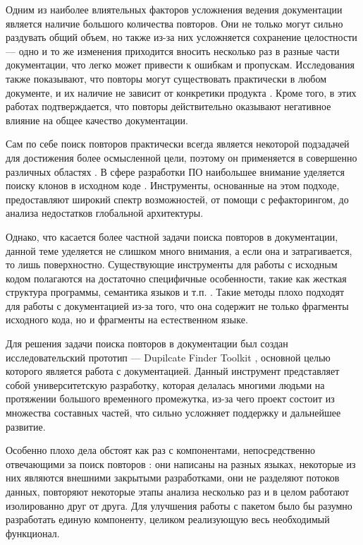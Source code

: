 \documentclass[14pt]{matmex-diploma-custom}
\begin{document}
Одним из наиболее влиятельных факторов усложнения ведения документации является наличие большого количества повторов. Они не только могут сильно раздувать общий объем, но также из-за них усложняется сохранение целостности --- одно и то же изменения приходится вносить несколько раз в разные части документации, что легко может привести к ошибкам и пропускам. Исследования также показывают, что повторы могут существовать практически в любом документе, и их наличие не зависит от конкретики продукта \cite{bib:art:JuergensCloneDetect, bib:art:DuplicatesStudy}. Кроме того, в этих работах подтверждается, что повторы действительно оказывают негативное влияние на общее качество документации.

Сам по себе поиск повторов практически всегда является некоторой подзадачей для достижения более осмысленной цели, поэтому он применяется в совершенно различных областях \cite{bib:art:NearDupSurvey}. В сфере разработки ПО наибольшее внимание уделяется поиску клонов в исходном коде \cite{bib:art:SoftwareClonesSurvey}. Инструменты, основанные на этом подходе, предоставляют широкий спектр возможностей, от помощи с рефакторингом, до анализа недостатков глобальной архитектуры.

Однако, что касается более частной задачи поиска повторов в документации, данной теме уделяется не слишком много внимания, а если она и затрагивается, то лишь поверхностно. Существующие инструменты для работы с исходным кодом полагаются на достаточно специфичные особенности, такие как жесткая структура программы, семантика языков и т.п. \cite{bib:tool:ASTSearch, bib:tool:ASTRefactor, bib:tool:ASTSuffix}. Такие методы плохо подходят для работы с документацией из-за того, что она содержит не только фрагменты исходного кода, но и фрагменты на естественном языке.

Для решения задачи поиска повторов в документации был создан исследовательский прототип --- Dupilcate Finder Toolkit \cite{bib:tool:DuplicateFinder}, основной целью которого является работа с документацией. Данный инструмент представляет собой университетскую разработку, которая делалась многими людьми на протяжении большого временного промежутка, из-за чего проект состоит из множества составных частей, что сильно усложняет поддержку и дальнейшее развитие.

Особенно плохо дела обстоят как раз с компонентами, непосредственно отвечающими за поиск повторов \cite{bib:tool:CloneMiner, bib:tool:FuzzySearch, bib:tool:ImprovedNgramSearch}: они написаны на разных языках, некоторые из них являются внешними закрытыми разработками, они не разделяют потоков данных, повторяют некоторые этапы анализа несколько раз и в целом работают изолированно друг от друга. Для улучшения работы с пакетом было бы разумно разработать единую компоненту, целиком реализующую весь необходимый функционал.
\end{document}
